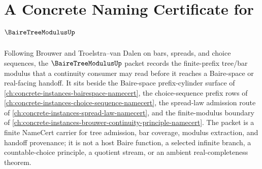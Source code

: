 \chapter{A Concrete Naming Certificate for $\BaireTreeModulusUp$}
\label{ch:concrete-instances-baire-tree-modulus-namecert}

Following Brouwer and Troelstra--van Dalen on bars, spreads, and choice sequences, the $\BaireTreeModulusUp$ packet records the finite-prefix tree/bar modulus that a continuity consumer may read before it reaches a Baire-space or real-facing handoff. It sits beside the Baire-space prefix-cylinder surface of \autoref{ch:concrete-instances-bairespace-namecert}, the choice-sequence prefix rows of \autoref{ch:concrete-instances-choice-sequence-namecert}, the spread-law admission route of \autoref{ch:concrete-instances-spread-law-namecert}, and the finite-modulus boundary of \autoref{ch:concrete-instances-brouwer-continuity-principle-namecert}. The packet is a finite NameCert carrier for tree admission, bar coverage, modulus extraction, and handoff provenance; it is not a host Baire function, a selected infinite branch, a countable-choice principle, a quotient stream, or an ambient real-completeness theorem.

